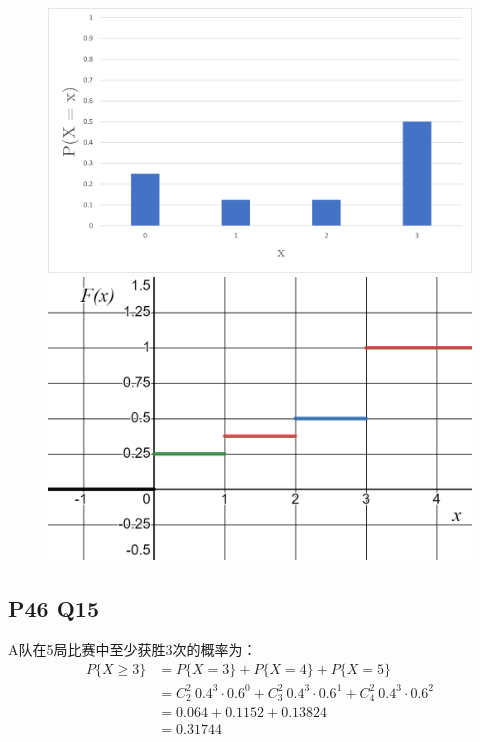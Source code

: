 \documentclass[a4paper,12pt]{ctexart}
\begin{document}
\begin{figure}[H]
	\begin{minipage}{0.5\textwidth}
		\centering
		\includegraphics[width=\textwidth]{Figure1.png}
	\end{minipage}
	\begin{minipage}{0.5\textwidth}
		\centering
		\includegraphics[width=\textwidth]{Figure2.png}
	\end{minipage}
\end{figure}

\subsection*{P46 Q15}
A队在5局比赛中至少获胜3次的概率为：
\begin{align*}
	P\{X \geq 3\} &= P\{X = 3\} + P\{X = 4\} + P\{X = 5\} \\
	&= C_2^2\ 0.4^3 \cdot 0.6^0 + C_3^2\ 0.4^3 \cdot 0.6^1 + C_4^2\ 0.4^3 \cdot 0.6^2 \\
	&= 0.064 + 0.1152 + 0.13824 \\
	&= 0.31744
\end{align*}
\end{document}
